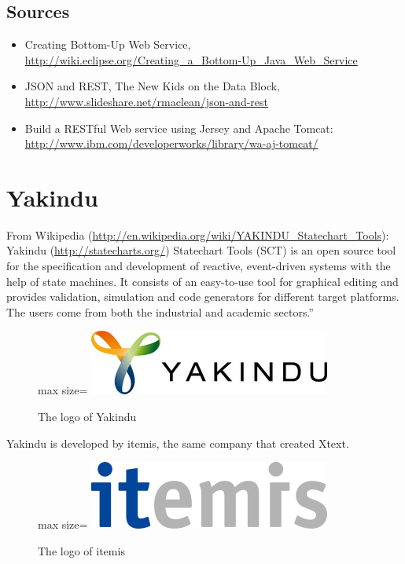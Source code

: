 \documentclass[]{report}
\let\Oldincludegraphics\includegraphics
\renewcommand{\includegraphics}[1]{
\begin{adjustbox}{max size={\textwidth}{\textheight}}
    \Oldincludegraphics[scale=0.6]{#1}%
\end{adjustbox}
}
\begin{document}
\section{Sources}

\begin{itemize}
\itemsep1pt\parskip0pt
\item
  Creating Bottom-Up Web Service,
  \url{http://wiki.eclipse.org/Creating_a_Bottom-Up_Java_Web_Service}
\item
  JSON and REST, The New Kids on the Data Block,
  \url{http://www.slideshare.net/rmaclean/json-and-rest}
\item
  Build a RESTful Web service using Jersey and Apache Tomcat:
  \url{http://www.ibm.com/developerworks/library/wa-aj-tomcat/}
\end{itemize}

\chapter{Yakindu}

From Wikipedia
(\url{http://en.wikipedia.org/wiki/YAKINDU_Statechart_Tools}): Yakindu
(\url{http://statecharts.org/}) Statechart Tools (SCT) is an open source
tool for the specification and development of reactive, event-driven
systems with the help of state machines. It consists of an easy-to-use
tool for graphical editing and provides validation, simulation and code
generators for different target platforms. The users come from both the
industrial and academic sectors.''

\begin{figure}[htbp]
\centering
\includegraphics{img/yakindu/yakindu_logo.png}
\caption{The logo of Yakindu}
\end{figure}

Yakindu is developed by itemis, the same company that created Xtext.

\begin{figure}[htbp]
\centering
\includegraphics{img/yakindu/itemis_logo.png}
\caption{The logo of itemis}
\end{figure}
\end{document}
